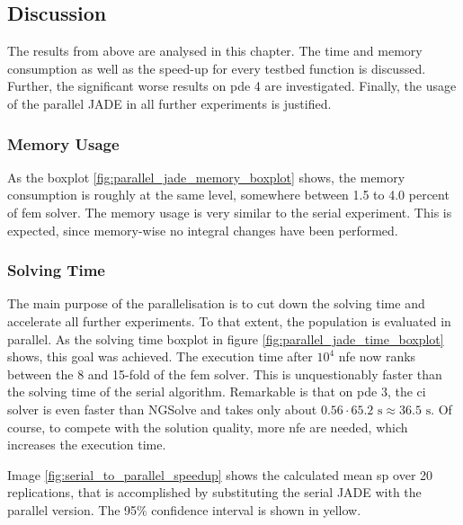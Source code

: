 \documentclass[./\jobname.tex]{subfiles}
\begin{document}
\subsection{Discussion}

The results from above are analysed in this chapter. The time and memory consumption as well as the speed-up for every testbed function is discussed. Further, the significant worse results on \gls{pde} 4 are investigated. Finally, the usage of the parallel JADE in all further experiments is justified. 

\subsubsection{Memory Usage}
As the boxplot \ref{fig:parallel_jade_memory_boxplot} shows, the memory consumption is roughly at the same level, somewhere between 1.5 to 4.0 percent of \gls{fem} solver. The memory usage is very similar to the serial experiment. This is expected, since memory-wise no integral changes have been performed.  

\subsubsection{Solving Time}
The main purpose of the parallelisation is to cut down the solving time and accelerate all further experiments. To that extent, the population is evaluated in parallel. As the solving time boxplot in figure \ref{fig:parallel_jade_time_boxplot} shows, this goal was achieved. The execution time after $10^4$ \gls{nfe} now ranks between the 8 and 15-fold of the \gls{fem} solver. This is unquestionably faster than the solving time of the serial algorithm. Remarkable is that on \gls{pde} 3, the \gls{ci} solver is even faster than NGSolve and takes only about $0.56 \cdot 65.2 \text{ s} \approx 36.5 \text{ s}$. Of course, to compete with the solution quality, more \gls{nfe} are needed, which increases the execution time. 

Image \ref{fig:serial_to_parallel_speedup} shows the calculated mean \gls{sp} over 20 replications, that is accomplished by substituting the serial JADE with the parallel version. The 95\% confidence interval is shown in yellow. 
\end{document}
